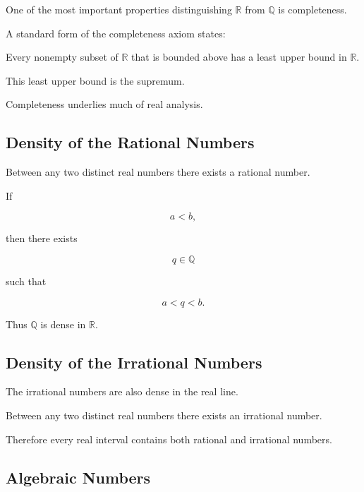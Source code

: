 One of the most important properties distinguishing \(\mathbb{R}\) from
\(\mathbb{Q}\) is completeness.

A standard form of the completeness axiom states:

\begin{importantbox}
Every nonempty subset of \(\mathbb{R}\) that is bounded above has a least
upper bound in \(\mathbb{R}\).
\end{importantbox}

This least upper bound is the supremum.

Completeness underlies much of real analysis.

\subsection{Density of the Rational Numbers}
\label{subsec:rational-density-reference}

Between any two distinct real numbers there exists a rational number.

If

\[
a<b,
\]

then there exists

\[
q\in\mathbb{Q}
\]

such that

\[
\boxed{
a<q<b.
}
\]

Thus \(\mathbb{Q}\) is dense in \(\mathbb{R}\).

\subsection{Density of the Irrational Numbers}
\label{subsec:irrational-density-reference}

The irrational numbers are also dense in the real line.

Between any two distinct real numbers there exists an irrational number.

Therefore every real interval contains both rational and irrational numbers.

\subsection{Algebraic Numbers}
\label{subsec:algebraic-numbers-reference}

